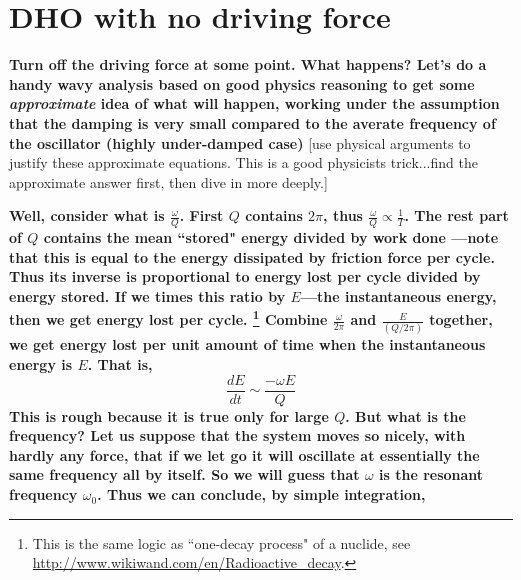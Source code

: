 \documentclass[]{revtex4}
\newcommand{\st}[1]{{\color{red}\bfseries #1}}
\begin{document}


\section*{DHO with no driving force}

\st{Turn off the driving force at some point.  What happens?
Let's do a handy wavy analysis based on good physics reasoning to
get some {\it approximate} idea of what will happen, working under the assumption that
the damping is very small compared to the averate frequency of the oscillator (highly under-damped case)}
[use physical arguments to justify these approximate equations.  This is a good physicists trick...find the approximate answer first, then dive in more deeply.]

\st{
Well, consider what is $\frac{ \omega }{ Q }$. First $Q$ contains $2\pi$, thus
$\frac{ \omega }{ Q } \propto \frac{ 1 }{ T }$. 
The rest part of $Q$ contains the mean ``stored" energy divided by work done 
---note that this is equal to the energy dissipated by friction force per cycle. Thus its
inverse is proportional to energy lost per cycle divided by energy stored. If we times
this ratio by $E$---the instantaneous energy, then we get energy lost per cycle.
\footnote{This is the same logic as ``one-decay process" of a nuclide, see
\url{http://www.wikiwand.com/en/Radioactive_decay}.
}
Combine
$\frac{ \omega }{ 2\pi }$ and $\frac{ E }{ (Q/2\pi) }$ together, we get energy lost
per unit amount of time when the instantaneous energy is $E$.
That is,
}
\[\frac{dE}{dt}\sim\frac{-\omega E}{Q}\]
\st{
This is rough because it is true only for large $Q$. But what is the frequency? 
Let us suppose that the system moves so nicely, with hardly any force, that if we let go
it will oscillate at essentially the same frequency all by itself. So we will guess that 
$\omega$ is the resonant frequency $\omega_0$. Thus we can conclude, by simple
integration,
}
\end{document}
